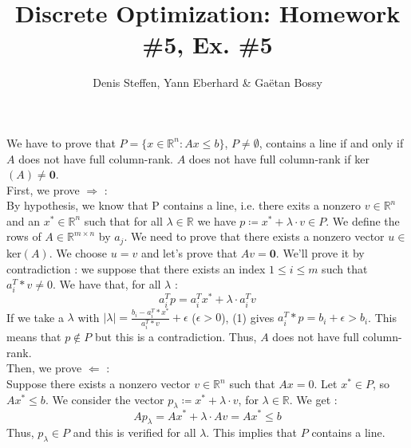 \documentclass[a4paper,11pt,french]{article}
\title{Discrete Optimization: Homework \#5, Ex. \#5}
\author{Denis Steffen, Yann Eberhard \& Gaëtan Bossy}
\begin{document}
    
    \maketitle
    
    We have to prove that $P = \{ x \in \mathbb{R}^n : Ax \leq b\}$, $P \not = \emptyset $, contains a line if and only if $A$ does not have full column-rank.
    $A$ does not have full column-rank if ker$(A) \not = \mathbf {0}$. 
\\

    First, we prove  $\Rightarrow$ : \\
    By hypothesis, we know that P contains a line, i.e. there exits a nonzero $v \in \mathbb{R}^n$ and an $x^* \in \mathbb{R}^n$ such that for all $\lambda \in \mathbb{R}$ we have $ p \coloneqq x^* + \lambda \cdot v \in P$. 
    We define the rows of $A \in \mathbb{R}^{m \times n}$ by $a_j$.
    We need to prove that there exists a nonzero vector $u \in$ ker$(A)$. We choose $u = v$ and let's prove that $Av = \mathbf 0$.  
    We'll prove it by contradiction : we suppose that there exists an index $1 \leq i \leq m$ such that $a_i^T*v \not = 0$. We have that, for all $\lambda$ : 
    \begin{equation}
        a_i^Tp = a_i^Tx^* + \lambda \cdot a_i^Tv
    \end{equation}
    If we take a $\lambda$ with $\left| \lambda \right| = \frac{ b_i - a_i^T*x^*}{a_i^T*v} + \epsilon$ ($\epsilon > 0$), (1) gives $a_i^T*p = b_i + \epsilon > b_i$. 
    This means that $p \not \in P$ but this is a contradiction. Thus, $A$ does not have full column-rank.
    \\

    Then, we prove $\Leftarrow$ : 
    \\ Suppose there exists a nonzero vector $v \in \mathbb{R}^n$ such that $Ax = 0$. 
    Let $x^* \in P$, so $Ax^* \leq b$. We consider the vector $p_\lambda \coloneqq x^* + \lambda \cdot v$, for $\lambda \in \mathbb{R}$. 
    We get : 
    \begin{equation*}
        Ap_\lambda = Ax^* + \lambda \cdot Av = Ax^* \leq b
    \end{equation*}
    Thus, $p_\lambda \in P$ and this is verified for all $\lambda$. This implies that $P$ contains a line.

    
    
\end{document}
